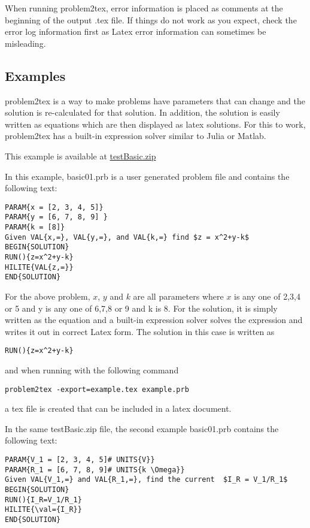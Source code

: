 \documentclass{article}
\begin{document}
When running problem2tex, error information is placed as comments at the beginning of the output .tex file.  If things do not work as you expect, check the error log information first as Latex error information can sometimes be misleading.

\subsection{Examples}

problem2tex is a way to make problems have parameters that can change and the solution is re-calculated for that solution.  In addition, the solution is easily written as equations which are then displayed as latex solutions.  For this to work, problem2tex has a built-in expression solver similar to Julia or Matlab.   

This example is available at \href{https://www.icewire.ca/examples/testBasic.zip}{testBasic.zip}

In this example, basic01.prb is a user generated problem file and contains the following text:
\begin{lstlisting}
PARAM{x = [2, 3, 4, 5]}
PARAM{y = [6, 7, 8, 9] }
PARAM{k = [8]}
Given VAL{x,=}, VAL{y,=}, and VAL{k,=} find $z = x^2+y-k$
BEGIN{SOLUTION}
RUN(){z=x^2+y-k}
HILITE{VAL{z,=}}
END{SOLUTION}
\end{lstlisting}

For the above problem, $x$, $y$ and $k$ are all parameters where $x$ is any one of 2,3,4 or 5 and
y is any one of 6,7,8 or 9 and k is 8.  For the solution, it is simply written as the equation and a built-in expression solver solves the expression and writes it out in correct Latex form.  The solution in this case is written as 

\begin{lstlisting}
RUN(){z=x^2+y-k}
\end{lstlisting}


and when running with the following command\\
\begin{lstlisting}
problem2tex -export=example.tex example.prb
\end{lstlisting}
a tex file is created that can be included in a latex document.

In the same testBasic.zip file, the second example basic01.prb contains the following text:
\begin{lstlisting}
PARAM{V_1 = [2, 3, 4, 5]# UNITS{V}}
PARAM{R_1 = [6, 7, 8, 9]# UNITS{k \Omega}}
Given VAL{V_1,=} and VAL{R_1,=}, find the current  $I_R = V_1/R_1$
BEGIN{SOLUTION}
RUN(){I_R=V_1/R_1}
HILITE{\val={I_R}}
END{SOLUTION}
\end{lstlisting}
 
\end{document}
